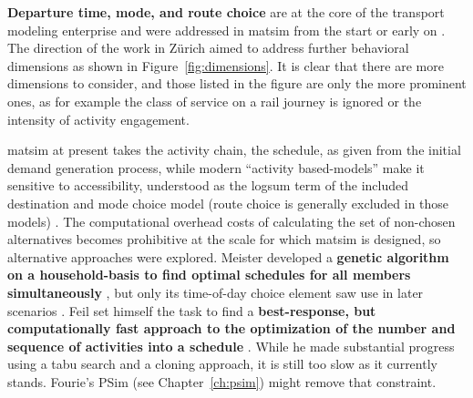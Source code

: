 
\textbf{Departure time, mode, and route choice} are at the core of the transport modeling enterprise and were addressed in \gls{matsim} from the start \citep{RaneyNagel2004agdb} or early on \citep{BalmerRaneyEtAl2005act-times,RieserGretherNagel2008modeChoiceCalculations}.
%
The direction of the work in Zürich aimed to address further behavioral dimensions 
as shown in Figure~\ref{fig:dimensions}.
It is clear that there are more dimensions to consider, and those listed in the figure are only the more prominent ones, as for example the class of service on a rail journey is ignored or the intensity of activity engagement. 

\gls{matsim} at present takes the activity chain, the schedule, as given from the initial demand generation process, while modern ``activity based-models'' make it sensitive to accessibility, understood as the logsum term of the included destination and mode choice model (route choice is generally excluded in those models) \citep[see][for an early example]{BenAkivaEtAl_Transportation_1996}.
The computational overhead costs of calculating the set of non-chosen alternatives becomes prohibitive at the scale for which \gls{matsim} is designed,
 so alternative approaches were explored. 
%
Meister developed a \textbf{genetic algorithm on a household-basis to find optimal schedules for all members simultaneously} \citep[reported in][]{MeisterEtAl_Transportation_2005},
but only its time-of-day choice element saw use in later scenarios \citep{MeisterEtAl_IATBR_2006}.
%
Feil set himself the task to find a \textbf{best-response, but computationally fast approach to the optimization of the number and sequence of activities into a schedule} \citep[][]{Feil_PhDThesis_2010}. While he made substantial progress using a tabu search and a cloning approach, it is still too slow as it currently stands. Fourie's PSim (see Chapter~\ref{ch:psim}) might remove that constraint.

